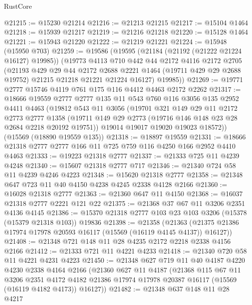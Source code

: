 \begin{lexlean}{RustCore}
\begin{coremodule}
@21215 := @15230 @21214
@21216 := @21213 @21215
@21217 := @15104 @1464
@21218 := @15939 @21217
@21219 := @21216 @21218
@21220 := @15128 @1464
@21221 := @15943 @21220
@21222 := @21219 @21221
@21224 := @15948 (@15950 @703)
@21259 := @19586
    (@19595
      (@21184 (@21192 (@21222 @21224 @16127) @19985))
      (@19773
        @4113
        @710
        @442
        @44
        @2172
        @4116
        @2172
        @2705
        (@21193
          @429
          @29
          @44
          @2172
          @2688
          @2221
          @1464
          (@19711 @429 @29 @2688 @19752)
          @21215
          @21218
          @21221
          @21224
          @16127)
        @19985))
@21269 := @19771 @2777 @15746 @4119 @761 @175 @116 @4412 @4463 @2172 @2262
@21317 := @18666
    @19559
    @2777
    @2777
    @135
    @11
    @543
    @760
    @116
    @3056
    @135
    @2952
    @4411
    @4463
    (@19812
      @543
      @11
      @3056
      (@19701
        @321
        @149
        @29
        @11
        @2172
        @2773
        @2777
        @1358
        (@19711 @149 @29 @2773 (@19716 @146 @148 @23 @28 @2684 @2218 @20192 @19751))
        @19014
        @19017
        @19020
        @19023
        @18572))
    (@15569 (@18890 @19559 @135))
@21318 := @18897 @19559
@21331 := @18666 @21318 @2777 @2777 @166 @11 @725 @759 @116 @4250 @166 @2952 @4410 @4463
@21333 := @19223 @21318 @2777
@21337 := @21333 @725 @11 @4239 @4248
@21340 := @15607 @21318 @2777 @717
@21346 := @21340 @724 @58 @11 @4239 @4246 @4223
@21348 := @15620 @21318 @2777
@21358 := @21348 @647 @723 @11 @40 @4150 @4238 @4245 @2338 @4128 @2166
@21360 := @16028 @21318 @2777
@21363 := @21360 @647 @11 @4150
@21368 := @16037 @21318 @2777 @2221 @121 @22
@21375 := @21368 @37 @67 @11 @3206 @2351 @4136 @4145
@21386 := @15370 @21318 @2777 @103 @23 @103 @3206 (@15378 (@15379 @21318 @103)) @19836
@21398 := @21358
    (@21363 (@21375 @21386 @17974 @17978 @20593 @16117 (@15569 (@16119 @4145 @4137)) @16127))
@21408 := @21348 @721 @148 @11 @28 @4235 @2172 @2218 @2338 @4156 @2166
@21412 := @21333 @721 @11 @4221 @4233
@21418 := @21340 @720 @58 @11 @4221 @4231 @4223
@21450 := @21348
    @627
    @719
    @11
    @40
    @4187
    @4220
    @4230
    @2338
    @4164
    @2166
    (@21360
      @627
      @11
      @4187
      (@21368
        @115
        @67
        @11
        @3206
        @2351
        @4172
        @4182
        @21386
        @17974
        @17978
        @20387
        @16117
        (@15569 (@16119 @4182 @4173))
        @16127))
@21482 := @21348
    @637
    @148
    @11
    @28
    @4217

\end{coremodule}
\end{lexlean}
